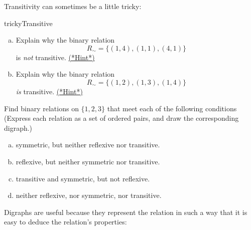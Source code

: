 %

Transitivity can sometimes be a little tricky:

\begin{exercise}{trickyTransitive}
\begin{enumerate}[(a)]
\item
Explain why the binary relation 
\[ R_{\sim} = \{(1,4), (1,1),(4,1) \} \]
is \emph{not} transitive.
\hyperref[sec:EquivalenceRelationsChap:hints]{(*Hint*)} 
\item
Explain why the binary relation 
\[ R_{\sim} = \{(1,2), (1,3),(1,4) \} \]
\emph{is} transitive.
\hyperref[sec:EquivalenceRelationsChap:hints]{(*Hint*)}
\end{enumerate}
\end{exercise}

\begin{exer} \label{BinRelSomePropsEx}
Find binary relations on $\{1,2,3\}$ that meet each of the following conditions 
(Express each relation as a set of ordered pairs, and draw the corresponding digraph.)
\begin{enumerate}[(a)]
\item \label{BinRelSomePropsEx-symmonly}
symmetric, but neither reflexive nor transitive.
\item \label{BinRelSomePropsEx-refonly}
 reflexive, but neither symmetric nor transitive.
\item \label{BinRelSomePropsEx-transandsymm}
transitive and symmetric, but not reflexive.
\item \label{BinRelSomePropsEx-none}
neither reflexive, nor symmetric, nor transitive.
\end{enumerate}
\end{exer}
Digraphs are useful because they represent the relation in such a way that it is easy to deduce the relation's properties: 

